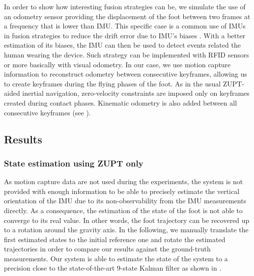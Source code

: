 In order to show how interesting fusion strategies can be, we simulate the use of an odometry sensor providing the displacement of the foot between two frames at a frequency that is lower than IMU.
This specific case is a common use of IMUs in fusion strategies to reduce the drift error due to IMU's biases \cite{santamaria2015high}. With a better estimation of its biases, the IMU can then be used to detect events related the human wearing the device.
Such strategy can be implemented with RFID sensors or more basically with visual odometry. 
In our case, we use motion capture information to reconstruct odometry between consecutive keyframes, allowing us to create keyframes during the flying phases of the foot. As in the usual ZUPT-aided inertial
navigation, zero-velocity constraints are imposed only on keyframes created during contact phases. Kinematic odometry is also added between all consecutive keyframes (see ).

%

\subsection{Results}
\subsubsection{State estimation using ZUPT only}

As motion capture data are not used during the experiments, the system is not provided with enough information to be able to precisely estimate the vertical orientation of the IMU due to its non-observability from the IMU measurements directly. 
As a consequence, the estimation of the state of the foot is not able to converge to its real value. In other words, the foot trajectory can be recovered up to a rotation around the gravity axis. 
In the following, we manually translate the first estimated states to the initial reference one and rotate the estimated trajectories in order to compare our results against the ground-truth measurements.
Our system is able to estimate the state of the system to a precision close to the state-of-the-art 9-state Kalman filter \cite{foxlin2005pedestrian} as shown in .

